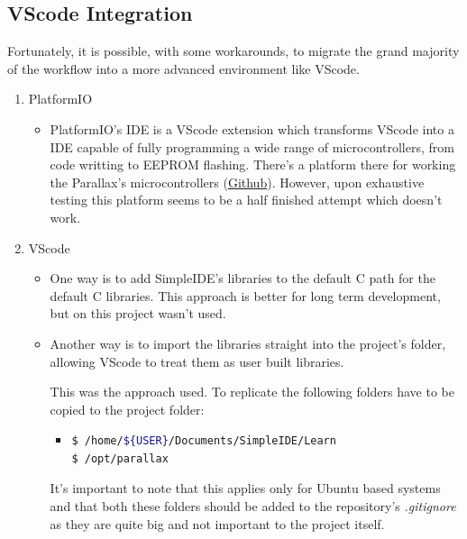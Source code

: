 \documentclass[sigconf,nonacm]{acmart}
\begin{document}
      \subsection{VScode Integration}

      Fortunately, it is possible, with some workarounds, to migrate the grand
      majority of the workflow into a more advanced environment like VScode.
      
      \begin{enumerate}
            \item PlatformIO
                  \begin{itemize}
                        \item PlatformIO's IDE is a VScode
                        extension which transforms VScode into a IDE capable of
                        fully programming a wide range of microcontrollers, from
                        code writting to EEPROM flashing. There's a platform
                        there for working the Parallax's
                        microcontrollers (\href{https://github.com/msquirogac/platform-propeller}{Github}).
                        However, upon exhaustive testing this platform seems to
                        be a half finished attempt which doesn't work.
                  \end{itemize}
            \item VScode
                  \begin{itemize}
                        \item One way is to add SimpleIDE's libraries to the
                        default C path for the default C libraries. This
                        approach is better for long term development, but on
                        this project wasn't used.

                        \item Another way is to import the libraries straight
                        into the project's folder, allowing VScode to treat them
                        as user built libraries.
                        
                        This was the approach used. To replicate the following
                        folders have to be copied to the project folder:
                        \begin{itemize}
                              \item \begin{lstlisting}[language=bash]
$ /home/${USER}/Documents/SimpleIDE/Learn
$ /opt/parallax
                                    \end{lstlisting}
                              \end{itemize}
                              It's important to note that this applies only for Ubuntu
                                    based systems and that both these folders should be
                                    added to the repository's \textit{.gitignore} as they
                                    are quite big and not important to the project itself.
                  \end{itemize}
      \end{enumerate}
\end{document}
